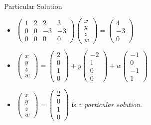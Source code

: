 \documentclass{beamer}
\begin{document}
\begin{frame}{Particular Solution}

\begin{itemize}
\item
$
\begin{pmatrix}
1 & 2 & 2 & 3 \\
0 & 0 & -3 & -3 \\
0 & 0 & 0 & 0
\end{pmatrix}
\begin{pmatrix}
x \\ y \\ z \\ w
\end{pmatrix}
=
\begin{pmatrix}
4 \\ -3 \\  0
\end{pmatrix}
$
\item
$
\begin{pmatrix}
x \\ y \\ z \\ w
\end{pmatrix}
=
\begin{pmatrix}
2 \\
0 \\
1 \\
0
\end{pmatrix}
+
y
\begin{pmatrix}
-2 \\
1 \\
0 \\
0
\end{pmatrix}
+
w
\begin{pmatrix}
-1 \\
0 \\
-1 \\
1
\end{pmatrix}
$
\item
$
\begin{pmatrix}
x \\ y \\ z \\ w
\end{pmatrix}
=
\begin{pmatrix}
2 \\
0 \\
1 \\
0
\end{pmatrix}
$
is a \emph{particular solution}.

\end{itemize}
\end{frame}
\end{document}

